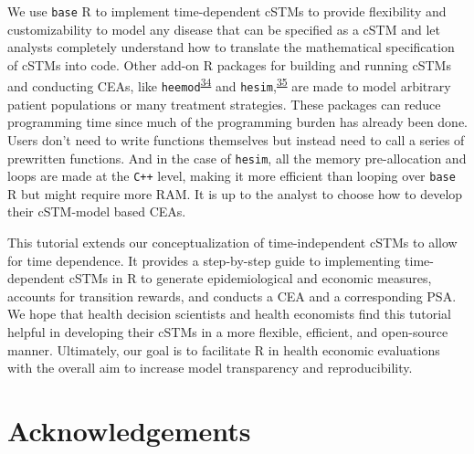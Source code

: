 \documentclass[
]{article}
\begin{document}
We use \texttt{base} R to implement time-dependent cSTMs to provide flexibility and customizability to model any disease that can be specified as a cSTM and let analysts completely understand how to translate the mathematical specification of cSTMs into code. Other add-on R packages for building and running cSTMs and conducting CEAs, like \texttt{heemod}\textsuperscript{\protect\hyperlink{ref-Filipovic-Pierucci2017}{34}} and \texttt{hesim},\textsuperscript{\protect\hyperlink{ref-Incerti2021}{35}} are made to model arbitrary patient populations or many treatment strategies. These packages can reduce programming time since much of the programming burden has already been done. Users don't need to write functions themselves but instead need to call a series of prewritten functions. And in the case of \texttt{hesim}, all the memory pre-allocation and loops are made at the \texttt{C++} level, making it more efficient than looping over \texttt{base} R but might require more RAM. It is up to the analyst to choose how to develop their cSTM-model based CEAs.

This tutorial extends our conceptualization of time-independent cSTMs to allow for time dependence. It provides a step-by-step guide to implementing time-dependent cSTMs in R to generate epidemiological and economic measures, accounts for transition rewards, and conducts a CEA and a corresponding PSA. We hope that health decision scientists and health economists find this tutorial helpful in developing their cSTMs in a more flexible, efficient, and open-source manner. Ultimately, our goal is to facilitate R in health economic evaluations with the overall aim to increase model transparency and reproducibility.

\hypertarget{acknowledgements}{%
\section{Acknowledgements}\label{acknowledgements}}
\end{document}
